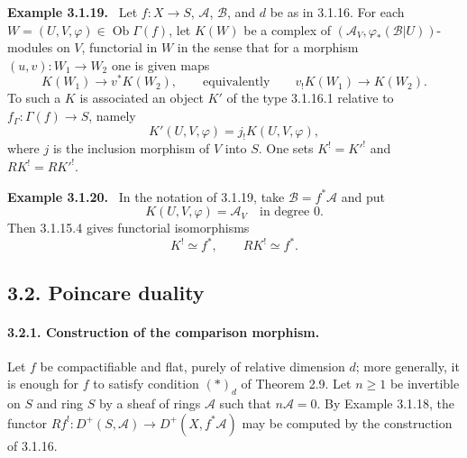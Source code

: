 \documentclass[12pt]{article}
\newcommand{\Aa}{\mathcal A}
\newcommand{\Bb}{\mathcal B}
\DeclareMathOperator{\Ob}{Ob}
\newenvironment{remarktext}[1]{\par\medskip\noindent\textbf{#1.}\ }{\par\medskip}
\begin{document}
\begin{remarktext}{Example 3.1.19}
Let $f:X\to S$, $\Aa$, $\Bb$, and $d$ be as in 3.1.16. For each $W=(U,V,\varphi)\in\Ob\Gamma(f)$, let $K(W)$ be a complex of $(\Aa_V,\varphi_*(\Bb|U))$-modules on $V$, functorial in $W$ in the sense that for a morphism $(u,v):W_1\to W_2$ one is given maps
\[
   K(W_1)\longrightarrow v^*K(W_2),
   \qquad\text{equivalently}\qquad
   v_!K(W_1)\longrightarrow K(W_2).
\]
To such a $K$ is associated an object $K'$ of the type 3.1.16.1 relative to $f_\Gamma:\Gamma(f)\to S$, namely
\begin{equation}
   K'(U,V,\varphi)=j_!K(U,V,\varphi), \tag{3.1.19.2}
\end{equation}
where $j$ is the inclusion morphism of $V$ into $S$. One sets $K^!={K'}^!$ and $RK^!=R{K'}^!$.
\end{remarktext}

\begin{remarktext}{Example 3.1.20}
In the notation of 3.1.19, take $\Bb=f^*\Aa$ and put
\begin{equation}
   K(U,V,\varphi)=\Aa_V\quad\text{in degree }0. \tag{3.1.20.1}
\end{equation}
Then 3.1.15.4 gives functorial isomorphisms
\begin{equation}
   K^!\simeq f^*,\qquad RK^!\simeq f^*. \tag{3.1.20.2--3}
\end{equation}
\end{remarktext}

\subsection*{3.2. Poincare duality}

\paragraph{3.2.1. Construction of the comparison morphism.}
Let $f$ be compactifiable and flat, purely of relative dimension $d$; more generally, it is enough for $f$ to satisfy condition $(*)_d$ of Theorem 2.9. Let $n\geq 1$ be invertible on $S$ and ring $S$ by a sheaf of rings $\Aa$ such that $n\Aa=0$. By Example 3.1.18, the functor $Rf^!:D^+(S,\Aa)\to D^+(X,f^*\Aa)$ may be computed by the construction of 3.1.16.
\end{document}
